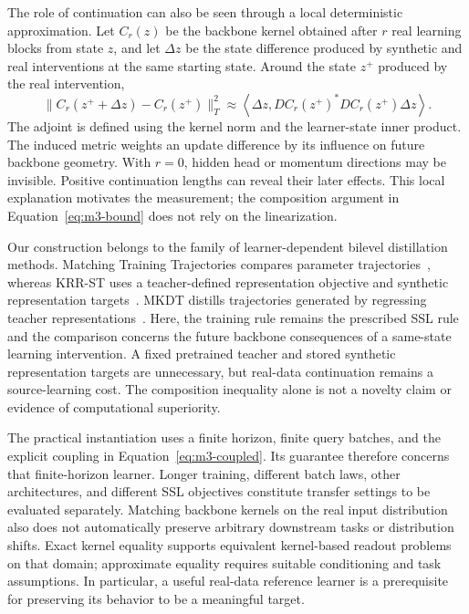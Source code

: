 The role of continuation can also be seen through a local deterministic approximation. Let $C_r(z)$ be the backbone kernel obtained after $r$ real learning blocks from state $z$, and let $\Delta z$ be the state difference produced by synthetic and real interventions at the same starting state. Around the state $z^+$ produced by the real intervention,
\begin{equation}
\|C_r(z^++\Delta z)-C_r(z^+)\|_T^2
\approx
\left\langle\Delta z,
DC_r(z^+)^*DC_r(z^+)\Delta z\right\rangle .
\label{eq:m3-local}
\end{equation}
The adjoint is defined using the kernel norm and the learner-state inner product. The induced metric weights an update difference by its influence on future backbone geometry. With $r=0$, hidden head or momentum directions may be invisible. Positive continuation lengths can reveal their later effects. This local explanation motivates the measurement; the composition argument in Equation~\eqref{eq:m3-bound} does not rely on the linearization.

Our construction belongs to the family of learner-dependent bilevel distillation methods. Matching Training Trajectories compares parameter trajectories~\cite{cazenavette2022mtt}, whereas KRR-ST uses a teacher-defined representation objective and synthetic representation targets~\cite{lee2024krrst}. MKDT distills trajectories generated by regressing teacher representations~\cite{joshi2025mkdt}. Here, the training rule remains the prescribed SSL rule and the comparison concerns the future backbone consequences of a same-state learning intervention. A fixed pretrained teacher and stored synthetic representation targets are unnecessary, but real-data continuation remains a source-learning cost. The composition inequality alone is not a novelty claim or evidence of computational superiority.

The practical instantiation uses a finite horizon, finite query batches, and the explicit coupling in Equation~\eqref{eq:m3-coupled}. Its guarantee therefore concerns that finite-horizon learner. Longer training, different batch laws, other architectures, and different SSL objectives constitute transfer settings to be evaluated separately. Matching backbone kernels on the real input distribution also does not automatically preserve arbitrary downstream tasks or distribution shifts. Exact kernel equality supports equivalent kernel-based readout problems on that domain; approximate equality requires suitable conditioning and task assumptions. In particular, a useful real-data reference learner is a prerequisite for preserving its behavior to be a meaningful target.


